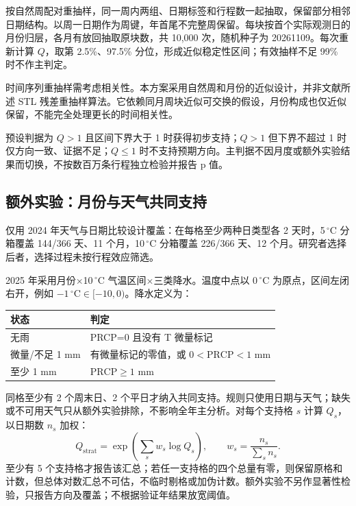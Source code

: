 \documentclass[UTF8,fontset=fandol,a4paper,zihao=-4]{ctexart}
\begin{document}
按自然周配对重抽样，同一周内两组、日期标签和行程数一起抽取，保留部分相邻日期结构。以周一日期作为周键，年首尾不完整周保留。每块按首个实际观测日的月份归层，各月有放回抽取原块数，共 10,000 次，随机种子为 20261109。每次重新计算 $Q$，取第 2.5\%、97.5\% 分位，形成近似稳定性区间；有效抽样不足 99\% 时不作主判定。

时间序列重抽样需考虑相关性\cite{bootstrap}。本方案采用自然周和月份的近似设计，并非文献所述 STL 残差重抽样算法。它依赖同月周块近似可交换的假设，月份构成也仅近似保留，不能完全处理更长的时间相关性。

预设判据为 $Q>1$ 且区间下界大于 1 时获得初步支持；$Q>1$ 但下界不超过 1 时仅方向一致、证据不足；$Q\leq 1$ 时不支持预期方向。主判据不因月度或额外实验结果而切换，不按数百万条行程独立检验并报告 p 值。

\subsection{额外实验：月份与天气共同支持}

仅用 2024 年天气与日期比较设计覆盖：在每格至少两种日类型各 2 天时，5\,$^\circ$C 分箱覆盖 144/366 天、11 个月，10\,$^\circ$C 分箱覆盖 226/366 天、12 个月。研究者选择后者，选择过程未按行程效应筛选。

2025 年采用月份$\times$10\,$^\circ$C 气温区间$\times$三类降水。温度中点以 0\,$^\circ$C 为原点，区间左闭右开，例如 $-1\,{}^\circ\mathrm{C}\in[-10,0)$。降水定义为：
\begin{center}
\begin{tabular}{ll}
\toprule
状态 & 判定\\
\midrule
无雨 & PRCP=0 且没有 T 微量标记\\
微量/不足 1 mm & 有微量标记的零值，或 $0<\mathrm{PRCP}<1$ mm\\
至少 1 mm & $\mathrm{PRCP}\geq1$ mm\\
\bottomrule
\end{tabular}
\end{center}

同格至少有 2 个周末日、2 个平日才纳入共同支持。规则只使用日期与天气；缺失或不可用天气只从额外实验排除，不影响全年主分析。对每个支持格 $s$ 计算 $Q_s$，以日期数 $n_s$ 加权：
\begin{equation}
 Q_{\mathrm{strat}}=\exp\!\left(\sum_s w_s\log Q_s\right),
 \qquad w_s=\frac{n_s}{\sum_s n_s}.
\end{equation}
至少有 5 个支持格才报告该汇总；若任一支持格的四个总量有零，则保留原格和计数，但总体对数汇总不可估，不临时剔格或加伪计数。额外实验不另作显著性检验，只报告方向及覆盖；不根据验证年结果放宽阈值。
\end{document}
